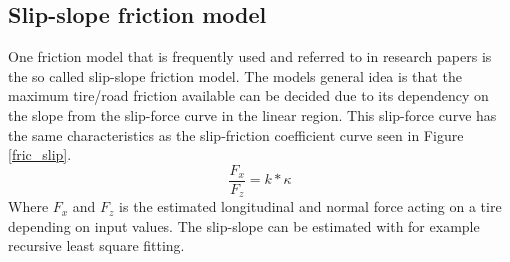 \subsection{Slip-slope friction model}

One friction model that is frequently used and referred to in research papers is the so called slip-slope friction model. The models general idea is that the maximum tire/road friction available can be decided due to its dependency on the slope from the slip-force curve in the linear region. This slip-force curve has the same characteristics as the slip-friction coefficient curve seen in Figure \ref{fric_slip}. 
\begin{equation}
	\dfrac{F_{x}}{F_{z}} = k*\kappa
\end{equation}
Where $ F_{x} $ and $ F_{z} $ is the estimated longitudinal and normal force acting on a tire depending on input values. The slip-slope can be estimated with for example recursive least square fitting. 
